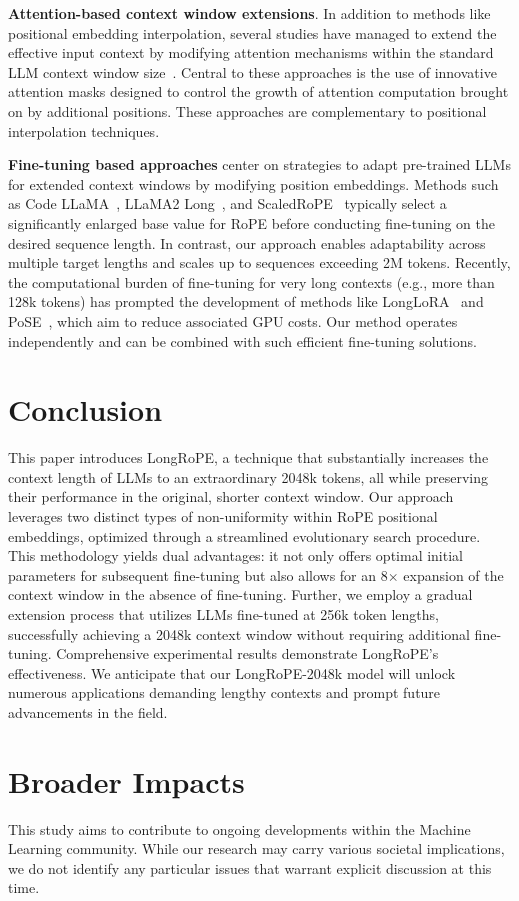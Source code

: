 \textbf{Attention-based context window extensions}. In addition to methods like positional embedding interpolation, several studies have managed to extend the effective input context by modifying attention mechanisms within the standard LLM context window size~\cite{han2023lminfinite, streamingllm,parallelwindow}. Central to these approaches is the use of innovative attention masks designed to control the growth of attention computation brought on by additional positions. These approaches are complementary to positional interpolation techniques.

\textbf{Fine-tuning based approaches} center on strategies to adapt pre-trained LLMs for extended context windows by modifying position embeddings. Methods such as Code LLaMA~\cite{codellama}, LLaMA2 Long~\cite{xiong2023effective}, and ScaledRoPE~\cite{liu2023scaling} typically select a significantly enlarged base value for RoPE before conducting fine-tuning on the desired sequence length. In contrast, our approach enables adaptability across multiple target lengths and scales up to sequences exceeding 2M tokens. Recently, the computational burden of fine-tuning for very long contexts (e.g., more than 128k tokens) has prompted the development of methods like LongLoRA~\cite{longlora} and PoSE~\cite{zhu2023pose}, which aim to reduce associated GPU costs. Our method operates independently and can be combined with such efficient fine-tuning solutions.

\section{Conclusion}

This paper introduces LongRoPE, a technique that substantially increases the context length of LLMs to an extraordinary 2048k tokens, all while preserving their performance in the original, shorter context window. Our approach leverages two distinct types of non-uniformity within RoPE positional embeddings, optimized through a streamlined evolutionary search procedure. This methodology yields dual advantages: it not only offers optimal initial parameters for subsequent fine-tuning but also allows for an 8$\times$ expansion of the context window in the absence of fine-tuning. Further, we employ a gradual extension process that utilizes LLMs fine-tuned at 256k token lengths, successfully achieving a 2048k context window without requiring additional fine-tuning. Comprehensive experimental results demonstrate LongRoPE’s effectiveness. We anticipate that our LongRoPE-2048k model will unlock numerous applications demanding lengthy contexts and prompt future advancements in the field.

\section*{Broader Impacts} This study aims to contribute to ongoing developments within the Machine Learning community. While our research may carry various societal implications, we do not identify any particular issues that warrant explicit discussion at this time.

	\balance

